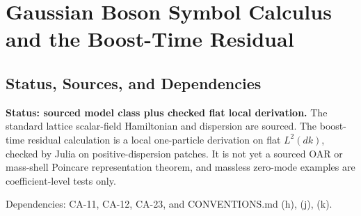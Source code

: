 
\section{Gaussian Boson Symbol Calculus and the Boost-Time Residual}
\label{sec:gaussian-boson-symbol-calculus}

\subsection{Status, Sources, and Dependencies}

\textbf{Status: sourced model class plus checked flat local derivation.}  The
standard lattice scalar-field Hamiltonian and dispersion are sourced.  The
boost-time residual calculation is a local one-particle derivation on flat
\(L^2(dk)\), checked by Julia on positive-dispersion patches.  It is not yet a
sourced OAR or mass-shell Poincare representation theorem, and massless
zero-mode examples are coefficient-level tests only.

Dependencies: CA-11, CA-12, CA-23, and CONVENTIONS.md (h), (j), (k).


